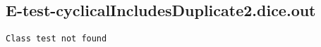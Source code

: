 \subsection{E-test-cyclicalIncludesDuplicate2.dice.out}
\begin{verbatim}
Class test not found

\end{verbatim}